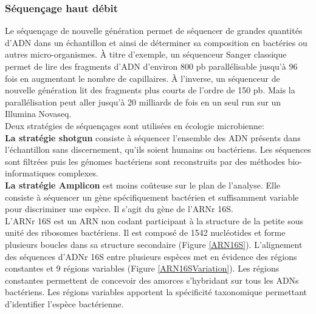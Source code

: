 \documentclass[12pt,a4paper]{article}
\begin{document}
\subsubsection{Séquençage haut débit}
Le séquençage de nouvelle génération permet de séquencer de grandes quantités d'ADN dans un échantillon et ainsi de déterminer sa composition en bactéries ou autres micro-organismes. À titre d'exemple, un séquenceur Sanger classique permet de lire des fragments d'ADN d'environ 800 pb parallélisable jusqu'à 96 fois en augmentant le nombre de capillaires.
À l'inverse, un séquenceur de nouvelle génération lit des fragments plus courts de l'ordre de 150 pb. Mais la parallélisation peut aller jusqu'à 20 milliards de fois en un seul run sur un Illumina Novaseq. \\
Deux stratégies de séquençages sont utilisées en écologie microbienne:  \\
\textbf{La stratégie shotgun} consiste à séquencer l'ensemble des  ADN présents dans l'échantillon sans discernement, qu'ils soient humains ou bactériens. Les séquences sont filtrées puis les génomes bactériens sont reconstruits par des méthodes bio-informatiques complexes. \\
\textbf{La stratégie Amplicon} est moins coûteuse sur le plan de l'analyse. Elle consiste à séquencer un gène spécifiquement bactérien et suffisamment variable pour discriminer une espèce. Il s'agit du gène de l'ARNr 16S.\\
L'ARNr 16S est un ARN non codant participant à la structure de la petite sous unité des ribosomes bactériens. Il est composé de 1542 nucléotides et forme plusieurs boucles dans sa structure secondaire (Figure \ref{ARN16S}).
L'alignement des séquences d'ADNr 16S entre plusieurs espèces met en évidence des régions constantes et 9 régions variables (Figure \ref{ARN16SVariation}). Les régions constantes permettent de concevoir des amorces s'hybridant sur tous les ADNs bactériens. Les régions variables apportent la spécificité taxonomique permettant d'identifier l'espèce bactérienne.
\end{document}
